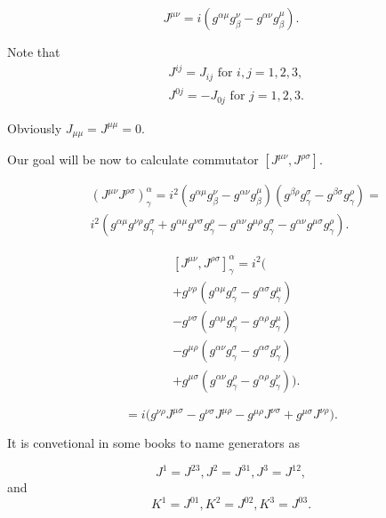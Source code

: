 \documentclass[main.tex]{subfiles}
\begin{document}
\begin{equation}
J^{\mu\nu} = i(g^{\alpha\mu} g^\nu_\beta - g^{\alpha\nu} g^\mu_\beta).
\end{equation}

Note that
\begin{align*}
& J^{ij} = J_{ij} \text{ for } i,j=1,2,3,\\
& J^{0j} = - J_{0j} \text{ for } j=1,2,3.
\end{align*}

Obviously $J_{\mu\mu} = J^{\mu\mu} = 0$.

Our goal will be now to calculate commutator $[J^{\mu\nu}, J^{\rho\sigma}]$.

\begin{align*}
& (J^{\mu\nu}J^{\rho\sigma})^\alpha_\gamma = i^2 (g^{\alpha\mu} g^\nu_\beta - g^{\alpha\nu} g^\mu_\beta)
(g^{\beta\rho} g^\sigma_\gamma - g^{\beta\sigma} g^\rho_\gamma) = \\
& i^2(g^{\alpha\mu}g^{\nu\rho}g^\sigma_\gamma + g^{\alpha\mu}g^{\nu\sigma}g^\rho_\gamma
- g^{\alpha\nu}g^{\mu\rho}g^\sigma_\gamma - g^{\alpha\nu}g^{\mu\sigma}g^\rho_\gamma).
\end{align*}

\begin{align*}
& [J^{\mu\nu}, J^{\rho\sigma}]^\alpha_\gamma = i^2
\big(\\
& + g^{\nu\rho }	(g^{\alpha\mu}g^\sigma_\gamma - g^{\alpha\sigma}g^\mu_\gamma)\\ 
& - g^{\nu\sigma} (g^{\alpha\mu}g^\rho_\gamma - g^{\alpha\rho}g^\mu_\gamma)\\
& - g^{\mu\rho}(g^{\alpha\nu}g^\sigma_\gamma - g^{\alpha\sigma}g^\nu_\gamma)\\
& + g^{\mu\sigma}(g^{\alpha\nu}g^\rho_\gamma - g^{\alpha\rho}g^\nu_\gamma)
\big).
\end{align*}

\begin{equation}
[J^{\mu\nu}, J^{\rho\sigma}] = 
i\big( g^{\nu\rho } J^{\mu\sigma} 
- g^{\nu\sigma} J^{\mu\rho}
- g^{\mu\rho} J^{\nu\sigma}
+ g^{\mu\sigma} J^{\nu\rho}\big).
\end{equation}

It is convetional in some books to name generators as 

\begin{equation}
J^1 = J^{23}, J^2 = J^{31}, J^3 = J^{12},
\end{equation}
and
\begin{equation}
K^1 = J^{01}, K^2 = J^{02}, K^3 = J^{03}.
\end{equation}
\end{document}
